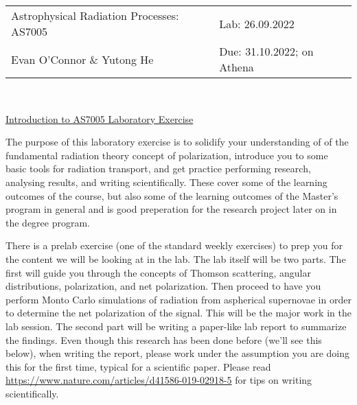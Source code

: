 \documentclass[12pt]{amsart}
\begin{document}
\noindent
\begin{tabular}{L{9.7cm} R{6.7cm}}
Astrophysical Radiation Processes: AS7005& Lab: 26.09.2022 \\
Evan O'Connor \& Yutong He & Due: 31.10.2022; on Athena\\
\end{tabular}\\

\vspace*{0.5cm}

\centerline{\Large \underline{Introduction to AS7005 Laboratory Exercise} }
\vspace*{0.5cm}

The purpose of this laboratory exercise is to solidify your
understanding of of the fundamental radiation theory concept of
polarization, introduce you to some basic tools for radiation
transport, and get practice performing research, analysing results,
and writing scientifically.  These cover some of the learning outcomes
of the course, but also some of the learning outcomes of the Master's
program in general and is good preperation for the research project
later on in the degree program.  \newline

There is a prelab exercise (one of the standard weekly exercises) to
prep you for the content we will be looking at in the lab.  The lab
itself will be two parts.  The first will guide you through the
concepts of Thomson scattering, angular distributions, polarization,
and net polarization. Then proceed to have you perform Monto Carlo
simulations of radiation from aspherical supernovae in order to
determine the net polarization of the signal.  This will be the major
work in the lab session. The second part will be writing a paper-like
lab report to summarize the findings. Even though this research has
been done before (we'll see this below), when writing the report,
please work under the assumption you are doing this for the first
time, typical for a scientific paper.  Please read
\mbox{\url{https://www.nature.com/articles/d41586-019-02918-5}} for
tips on writing scientifically.  \newline
\end{document}
